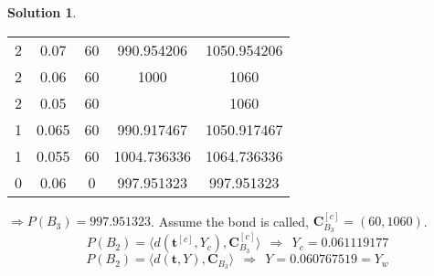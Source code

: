 \documentclass[a4paper, 10pt]{article}
\theoremstyle{definition}
\theoremstyle{hSol}
\newtheorem*{solution}{Solution}
\begin{document}
\begin{solution}
\begin{table}[H]
\begin{tabular}{|r|cccc|}
\hline
2 & 0.07 & 60 & 990.954206 & 1050.954206\\
2 & 0.06 & 60 & 1000 & 1060\\
2 & 0.05 & 60 & \color{red}{1000} & 1060 \\
\hline
1 & 0.065 & 60 & 990.917467 & 1050.917467\\
1 & 0.055 & 60 & 1004.736336 & 1064.736336\\
\hline
0 & 0.06 & 0 & 997.951323 & 997.951323\\
\hline
\end{tabular}
\label{tab:cbc3}
\end{table}
$\Rightarrow P(B_3) = 997.951323$. Assume the bond is called, $\bm{C}_{B_3}^{[c]}=(60, 1060)$. 
$$
P(B_2) = \langle d(\bm{t}^{[c]}, Y_c), \bm{C}_{B_3}^{[c]} \rangle~~\Rightarrow~~Y_c = 0.061119177
$$
$$
P(B_2) = \langle d(\bm{t}, Y), \bm{C}_{B_3} \rangle~~\Rightarrow~~Y = 0.060767519 = Y_w
$$
\end{solution}
\end{document}
